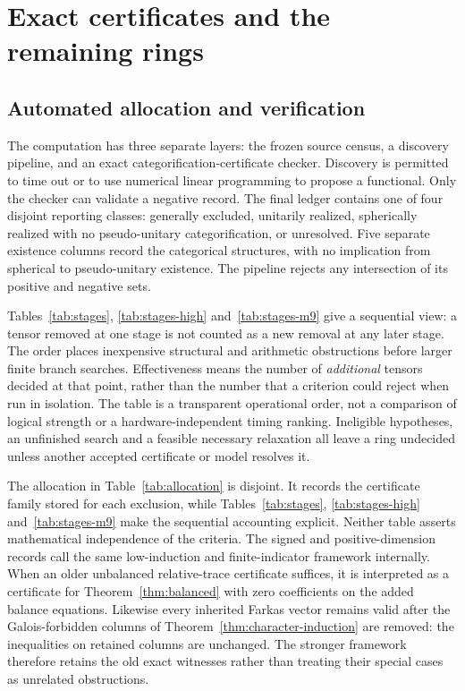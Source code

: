 \section{Exact certificates and the remaining rings}\label{sec:certification}
\subsection{Automated allocation and verification}\label{sec:verification}
The computation has three separate layers: the frozen source census,
a discovery pipeline, and an exact categorification-certificate checker. Discovery is permitted to time
out or to use numerical linear programming to propose a functional.
Only the checker can validate a negative record. The final ledger
contains one of four disjoint reporting classes: generally excluded,
unitarily realized, spherically realized with no pseudo-unitary
categorification, or unresolved. Five separate existence columns record
the categorical structures, with no implication from spherical to
pseudo-unitary existence. The pipeline rejects any intersection
of its positive and negative sets.




Tables~\ref{tab:stages}, \ref{tab:stages-high} and~\ref{tab:stages-m9} give a sequential view: a tensor removed at one
stage is not counted as a new removal at any later stage. The order
places inexpensive structural and arithmetic obstructions before
larger finite branch searches. Effectiveness means the number of
\emph{additional} tensors decided at that point, rather than the number
that a criterion could reject when run in isolation. The table is a
transparent operational order, not a comparison of logical strength or
a hardware-independent timing ranking. Ineligible hypotheses, an
unfinished search and a feasible necessary relaxation all leave a
ring undecided unless another accepted certificate or model resolves it.



The allocation in Table~\ref{tab:allocation} is disjoint. It records
the certificate family stored for each exclusion, while
Tables~\ref{tab:stages}, \ref{tab:stages-high} and~\ref{tab:stages-m9} make the sequential accounting explicit.
Neither table asserts mathematical independence of the criteria. The signed and positive-dimension records call the
same low-induction and finite-indicator framework internally. When an
older unbalanced relative-trace certificate suffices, it is interpreted
as a certificate for Theorem~\ref{thm:balanced} with zero coefficients
on the added balance equations. Likewise every inherited Farkas vector remains valid after the Galois-forbidden columns of Theorem~\ref{thm:character-induction} are removed: the inequalities on retained columns are unchanged. The stronger framework therefore retains the old exact witnesses rather than treating their special cases as unrelated obstructions.

